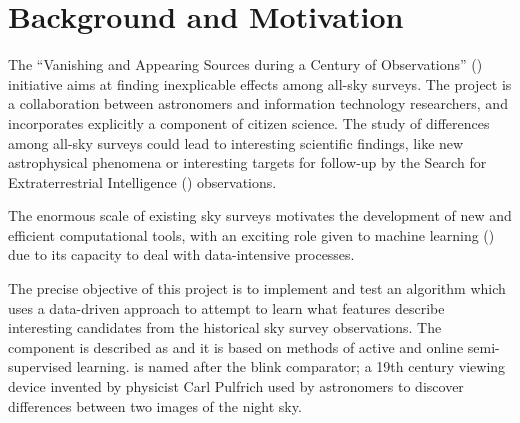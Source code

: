 \section{Background and Motivation} \label{sect:intro:background}

The ``Vanishing and Appearing Sources during a Century of Observations'' (\vasco) initiative aims at finding inexplicable effects among all-sky surveys. The \vasco project is a collaboration between astronomers and information technology researchers, and incorporates explicitly a component of citizen science. The study of differences among all-sky surveys could lead to interesting scientific findings, like new astrophysical phenomena or interesting targets for follow-up by the Search for Extraterrestrial Intelligence (\seti) observations. \newline

The enormous scale of existing sky surveys motivates the development of new and efficient computational tools, with an exciting role given to machine learning (\ml) due to its capacity to deal with data-intensive processes. \newline

The precise objective of this project is to implement and test an \ml algorithm which uses a data-driven approach to attempt to learn what features describe interesting candidates from the historical sky survey observations. The \ml component is described as \mlblink and it is based on methods of active and online semi-supervised learning. \mlblink is named after the blink comparator; a 19th century viewing device invented by physicist Carl Pulfrich used by astronomers to discover differences between two images of the night sky.
